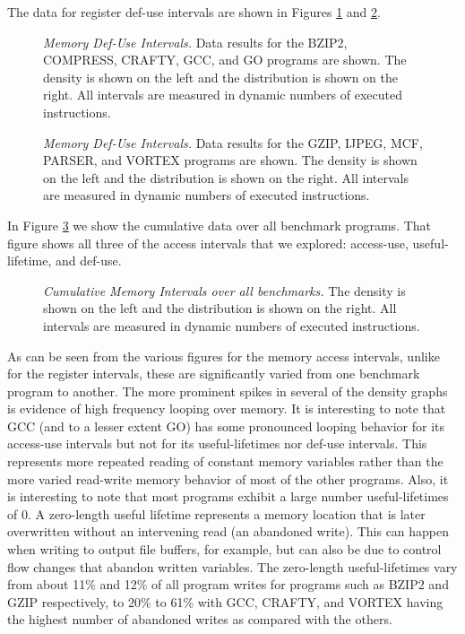 \documentclass[10pt,dvips]{article}
\begin{document}
%
%
%
The data for register def-use intervals are
shown in Figures \ref{fig:aa_muse} 
and \ref{fig:ab_muse}.
%
\begin{figure}
\centering
{}
\caption{{\em Memory Def-Use Intervals.} 
\small{
Data results for the 
BZIP2, COMPRESS, CRAFTY, GCC, and GO programs are shown.
The density is shown on the left and the distribution is shown
on the right.
All intervals are measured in dynamic numbers of executed instructions.}
}
\label{fig:aa_muse}
\end{figure}
%
\begin{figure}
\centering
{}
\caption{{\em Memory Def-Use Intervals.} 
\small{
Data results for the
GZIP, IJPEG, MCF, PARSER, and VORTEX programs are shown.
The density is shown on the left and the distribution is shown
on the right.
All intervals are measured in dynamic numbers of executed instructions.}
}
\label{fig:ab_muse}
\end{figure}
%
%
In Figure \ref{fig:a_mcum} we show the cumulative data over all
benchmark programs.  That figure shows all three of the access
intervals that we explored: access-use, useful-lifetime, and def-use.
%
\begin{figure}[tb]
\centering
{}
\caption{{\em Cumulative Memory Intervals over all benchmarks.} 
\small{
The density is shown on the left and the distribution is shown
on the right.
All intervals are measured in dynamic numbers of executed instructions.}
}
\label{fig:a_mcum}
\end{figure}
%
As can be seen from the various figures for the memory access
intervals, unlike for the register intervals, these are significantly
varied from one benchmark program to another.
The more prominent spikes in several of the density graphs
is evidence of high frequency looping over memory.
It is interesting to note that GCC (and to a lesser extent GO)
has some pronounced
looping behavior for its access-use intervals but not for
its useful-lifetimes nor def-use intervals.
This represents more repeated reading of constant memory variables
rather than the more varied read-write memory behavior of 
most of the other programs.  Also, it is interesting to note
that most programs exhibit a large number useful-lifetimes of 0.
A zero-length useful lifetime represents a memory location that
is later overwritten without an intervening read (an abandoned write).  
This
can happen when writing to output file buffers, for example, but can also
be due to control flow changes that abandon written variables.
The zero-length useful-lifetimes vary from about 11\% and 12\% of all
program writes for programs such as BZIP2 and GZIP respectively,
to 20\% to 61\% with GCC, CRAFTY, and VORTEX having the highest
number of abandoned writes as compared with the others.
%
%
\end{document}
